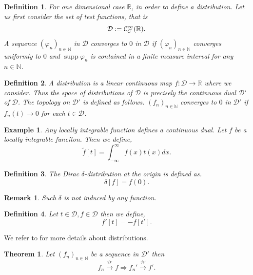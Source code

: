 \documentclass{article}
\newtheorem{theorem}{Theorem} [section]
\newtheorem{definition}{Definition}[section]
\newtheorem{remark}{Remark}[section]
\newtheorem{example}{Example}[section]
\DeclareMathOperator{\supp}{supp}
\newcommand{\defeq}{\vcentcolon=}
\newcommand{\N}[0]{\mathbb{N}}
\newcommand{\R}[0]{\mathbb{R}}
\newcommand{\ck}[1]{\mathcal{C}^{#1}}
\newcommand{\cinf}[0]{\ck{\infty}}
\begin{document}
\begin{definition}
  For one dimensional case $\R$, in order to define a distribution. Let us first consider the set of test functions, that is 
  \begin{equation*}
    \mathcal{D} \defeq \cinf_C(\R).
  \end{equation*}
  A sequence $(\varphi_n)_{n\in \N}$ in $\mathcal{D}$ converges to $0$ in $\mathcal{D}$ if $(\varphi_n)_{n\in \N}$ converges uniformly to $0$ and $\supp \varphi_n$ is contained in a finite measure interval for any $n\in\N$.
\end{definition}
\begin{definition} 
  A distribution is a linear continuous map $f:\mathcal{D}\to\R$ where we consider. Thus the space of distributions of $\mathcal{D}$ is precisely the continuous dual $\mathcal{D}'$ of $\mathcal{D}$.
  The topology on $\mathcal{D}'$ is defined as follows. $(f_n)_{n\in \N}$ converges to $0$ in $\mathcal{D}'$ if $f_n(t)\to 0$ for each $t\in \mathcal{D}$. 
\end{definition}

\begin{example}
  Any locally integrable function defines a continuous dual. Let $f$ be a locally integrable funciton. Then we define,
  \begin{equation*}
    \tilde{f}[t] = \int_{-\infty}^\infty f(x)t(x)dx.
  \end{equation*}
\end{example}

\begin{definition}
  The Dirac $\delta$-distribution at the origin is defined as.
  \begin{equation*}
    \delta[f] = f(0).
  \end{equation*}
\end{definition}

\begin{remark}
  Such $\delta$ is not induced by any function.
\end{remark}

\begin{definition}
  Let $t\in\mathcal{D},f\in\mathcal{D}$ then we define, 
  \begin{equation*}
    f'[t] = -f[t'].
  \end{equation*}
\end{definition}

We refer to \cite{laurent} for more details about distributions.

\begin{theorem}
  Let $(f_n)_{n\in \N}$ be a sequence in $\mathcal{D}'$ then 
  \begin{equation*}
    f_n\stackrel{\mathcal{D}'}{\to}f\Rightarrow f_n'\stackrel{\mathcal{D}'}{\to}f'.
  \end{equation*}
\end{theorem}
\end{document}
